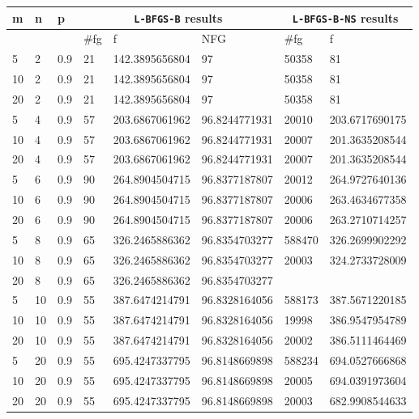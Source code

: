 \begin{table}
  \begin{center}
    \footnotesize
    \begin{tabular}{|l|l|l|l|l|l|l|l|}
      \hline
m  &  n  &  p  & \multicolumn{3}{|c|}{\texttt{L-BFGS-B} results} & \multicolumn{2}{|c|}{\texttt{L-BFGS-B-NS} results} \\ \hline
& &  & \#fg & f & NFG & \#fg & f \\ \hline
      5 & 2 & 0.9 & 21 & 142.3895656804 & 97 & 50358 & 81 \\ 
      10 & 2 & 0.9 & 21 & 142.3895656804 & 97 & 50358 & 81 \\
      20 & 2 & 0.9 & 21 & 142.3895656804 & 97 & 50358 & 81\\
      5 & 4 & 0.9 & 57 & 203.6867061962 & 96.8244771931 & 20010 & 203.6717690175\\
      10 & 4 & 0.9 & 57 & 203.6867061962 & 96.8244771931 & 20007 & 201.3635208544\\
      20 & 4 & 0.9 & 57 & 203.6867061962 & 96.8244771931 & 20007 & 201.3635208544\\
      5 & 6 & 0.9 & 90 & 264.8904504715 & 96.8377187807 & 20012 & 264.9727640136\\
      10 & 6 & 0.9 & 90 & 264.8904504715 & 96.8377187807 & 20006 & 263.4634677358\\
      20 & 6 & 0.9 & 90 & 264.8904504715 & 96.8377187807 & 20006 & 263.2710714257\\
      5 & 8 & 0.9 & 65 & 326.2465886362 & 96.8354703277 & 588470 & 326.2699902292\\
      10 & 8 & 0.9 & 65 & 326.2465886362 & 96.8354703277 & 20003 & 324.2733728009\\
      20 & 8 & 0.9 & 65 & 326.2465886362 & 96.8354703277 &  & \\
      5 & 10 & 0.9 & 55 & 387.6474214791 & 96.8328164056 & 588173 & 387.5671220185\\
      10 & 10 & 0.9 & 55 & 387.6474214791 & 96.8328164056 & 19998 & 386.9547954789\\
      20 & 10 & 0.9 & 55 & 387.6474214791 & 96.8328164056 & 20002 & 386.5111464469\\
      5 & 20 & 0.9 & 55 & 695.4247337795 & 96.8148669898 & 588234 & 694.0527666868\\
      10 & 20 & 0.9 & 55 & 695.4247337795 & 96.8148669898 & 20005 & 694.0391973604\\
      20 & 20 & 0.9 & 55 & 695.4247337795 & 96.8148669898 & 20003 & 682.9908544633\\

\end{tabular}
\end{center}
\end{table}
